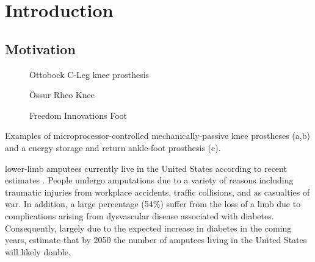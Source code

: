 \chapter{Introduction}\label{sec:intro}

\section{Motivation}\label{sec:intro_motivation}
\begin{marginfigure}[0.8in]
    \centering
	\begin{subfigure}[b]{\textwidth}
    	\centering
        \caption{Ottobock C-Leg knee prosthesis}
        \label{fig:ottobock_cleg}
        \vspace{0.25in}
	\end{subfigure}
	\begin{subfigure}[b]{\textwidth}
    	\centering
        \caption{Össur Rheo Knee}
        \label{fig:ossur_rheo}
        \vspace{0.25in}
	\end{subfigure}
	\begin{subfigure}[b]{\textwidth}
    	\centering
        \caption{Freedom Innovations Foot}
        \label{fig:freedom_innovations_foot}
	\end{subfigure}
    \caption{Examples of microprocessor-controlled mechanically-passive knee
    prostheses (a,b) and a energy storage and return ankle-foot prosthesis (c).}
\end{marginfigure}
 lower-limb amputees currently live in the
United States according to recent estimates \citep{ziegler2008estimating}.
People undergo amputations due to a variety of reasons including traumatic
injuries from workplace accidents, traffic collisions, and as casualties of war.
In addition, a large percentage (54\%) suffer from the loss of a limb due to
complications arising from dysvascular disease associated with diabetes.
Consequently, largely due to the expected increase in diabetes in the coming
years, \citet{ziegler2008estimating} estimate that by 2050 the number of
amputees living in the United States will likely double.

